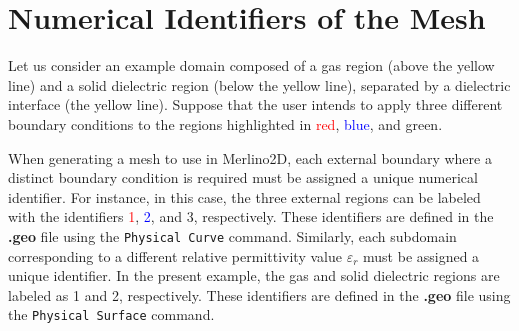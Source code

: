 \documentclass[12pt,a4paper]{article}
\newcommand{\matlabs}[1]{{\lstinline[style=MatlabStyle]!#1!}}
\begin{document}
	\section{Numerical Identifiers of the Mesh}
	\label{sec:NemericalIdentifiers}
	\begin{center}
	\end{center}
	Let us consider an example domain composed of a \colorbox{aircolor}{gas region} (above the yellow line) and a \colorbox{dielcolor}{solid dielectric region} (below the yellow line), separated by a dielectric interface (the yellow line). Suppose that the user intends to apply three different boundary conditions to the regions highlighted in \textcolor{red}{red}, \textcolor{blue}{blue}, and \textcolor{mygreen}{green}.
	
	When generating a mesh to use in Merlino2D, each external boundary where a distinct boundary condition is required must be assigned a unique numerical identifier. For instance, in this case, the three external regions can be labeled with the identifiers \textcolor{red}{1}, \textcolor{blue}{2}, and \textcolor{mygreen}{3}, respectively. These identifiers are defined in the \textbf{.geo} file using the \matlabs{Physical Curve} command.
	Similarly, each subdomain corresponding to a different relative permittivity value $\varepsilon_r$ must be assigned a unique identifier. In the present example, the gas and solid dielectric regions are labeled as \colorbox{aircolor}{1} and \colorbox{dielcolor}{2}, respectively. These identifiers are defined in the \textbf{.geo} file using the \matlabs{Physical Surface} command.
	
\end{document}
